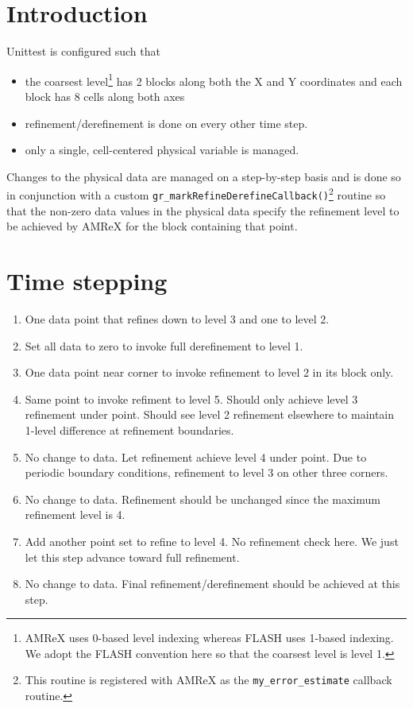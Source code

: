\documentclass[12pt,letterpaper]{article}
\begin{document}
\setlength{\parindent}{0pt}

\section{Introduction}
Unittest is configured such that
\begin{itemize}
\item{the coarsest level\footnote{AMReX uses 0-based level indexing whereas
FLASH uses 1-based indexing.  We adopt the FLASH convention here so that the coarsest
level is level 1.} has 2 blocks along both the X and Y
coordinates and each block has 8 cells along both axes}
\item{refinement/derefinement is done on every other time step.}
\item{only a single, cell-centered physical variable is managed.}
\end{itemize}

Changes to the physical data are managed on a step-by-step basis and is done so
in conjunction with a custom
\texttt{gr\_markRefineDerefineCallback()}\footnote{This routine is registered
with AMReX as the \texttt{my\_error\_estimate} callback routine.} routine so that the
non-zero data values in the physical data specify the refinement level to be
achieved by AMReX for the block containing that point.

\section{Time stepping}
\begin{enumerate}
\item[(Init)]{One data point that refines down to level 3 and one to level 2.}
\item[(Steps 1/2)]{Set all data to zero to invoke full derefinement to level 1.}
\item[(Steps 3/4)]{One data point near corner to invoke refinement to level 2 in
its block only.}
\item[(Steps 5/6)]{Same point to invoke refiment to level 5.  Should only achieve
level 3 refinement under point.  Should see level 2 
refinement elsewhere to maintain 1-level difference at refinement boundaries.}
\item[(Steps 7/8)]{No change to data.  Let refinement achieve level 4 under
point.  Due to periodic boundary conditions, refinement to level 3 on other
three corners.}
\item[(Steps 9/10)]{No change to data.  Refinement should be unchanged since
the maximum refinement level is 4.}
\item[(Steps 11/12)]{Add another point set to refine to level 4.  No refinement check
here.  We just let this step advance toward full refinement.}
\item[(Steps 13/14)]{No change to data.  Final refinement/derefinement should be
achieved at this step.}
\end{enumerate}
\end{document}
